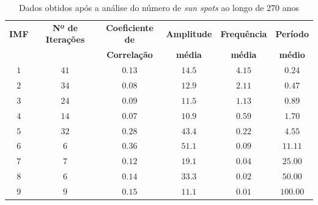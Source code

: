 \documentclass[letterpaper]{article}
\begin{document}
\begin{table}[H]
\centering
\begin{tabular}{c c c c c c}
\hline
\textbf{IMF} & \textbf{Nº de Iterações} & \textbf{Coeficiente de} & \textbf{Amplitude} & \textbf{Frequência} & \textbf{Período}\\
 &  & \textbf{Correlação} & \textbf{média} & \textbf{média} & \textbf{médio}\\
\hline
$1$ & $41$ & $0.13$ & $14.5$ & $4.15$ & $0.24$\\
$2$ & $34$ & $0.08$ & $12.9$ & $2.11$ & $0.47$\\
$3$ & $24$ & $0.09$ & $11.5$ & $1.13$ & $0.89$\\
$4$ & $14$ & $0.07$ & $10.9$ & $0.59$ & $1.70$\\
$5$ & $32$ & $0.28$ & $43.4$ & $0.22$ & $4.55$\\
$6$ & $6$ & $0.36$ & $51.1$ & $0.09$ & $11.11$\\
$7$ & $7$ & $0.12$ & $19.1$ & $0.04$ & $25.00$\\
$8$ & $6$ & $0.14$ & $33.3$ & $0.02$ & $50.00$\\
$9$ & $9$ & $0.15$ & $11.1$ & $0.01$ & $100.00$\\
\hline
\end{tabular}
\caption{Dados obtidos após a análise do número de \textit{sun spots} ao longo de 270 anos}
\end{table}
\end{document}
